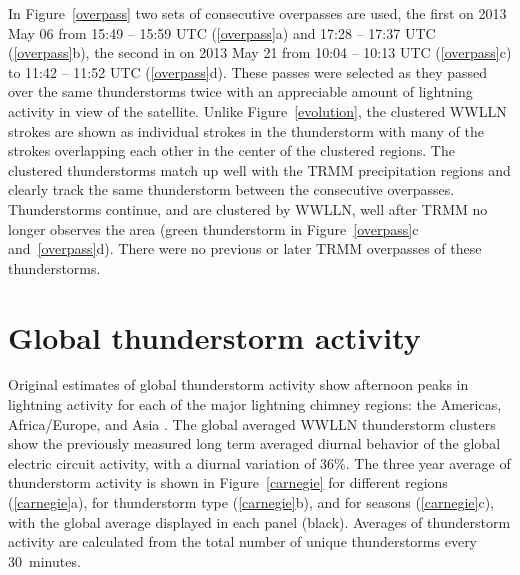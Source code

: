 In Figure~\ref{overpass} two sets of consecutive overpasses are used, the first on 2013 May 06 from 15:49 -- 15:59 UTC (\ref{overpass}a) and 17:28 -- 17:37 UTC (\ref{overpass}b), the second in on 2013 May 21 from 10:04 -- 10:13 UTC (\ref{overpass}c) to 11:42 -- 11:52 UTC (\ref{overpass}d).
These passes were selected as they passed over the same thunderstorms twice with an appreciable amount of lightning activity in view of the satellite.
Unlike Figure~\ref{evolution}, the clustered WWLLN strokes are shown as individual strokes in the thunderstorm with many of the strokes overlapping each other in the center of the clustered regions.
The clustered thunderstorms match up well with the TRMM precipitation regions and clearly track the same thunderstorm between the consecutive overpasses.
Thunderstorms continue, and are clustered by WWLLN, well after TRMM no longer observes the area (green thunderstorm in Figure~\ref{overpass}c and~\ref{overpass}d).
There were no previous or later TRMM overpasses of these thunderstorms.

\section{Global thunderstorm activity}

Original estimates of global thunderstorm activity show afternoon peaks in lightning activity for each of the major lightning chimney regions: the Americas, Africa/Europe, and Asia \citep{Wilson1921}.
The global averaged WWLLN thunderstorm clusters show the previously measured long term averaged diurnal behavior of the global electric circuit activity, with a diurnal variation of 36\%.
The three year average of thunderstorm activity is shown in Figure~\ref{carnegie} for different regions (\ref{carnegie}a), for thunderstorm type (\ref{carnegie}b), and for seasons (\ref{carnegie}c), with the global average displayed in each panel (black).
Averages of thunderstorm activity are calculated from the total number of unique thunderstorms every 30~minutes.

